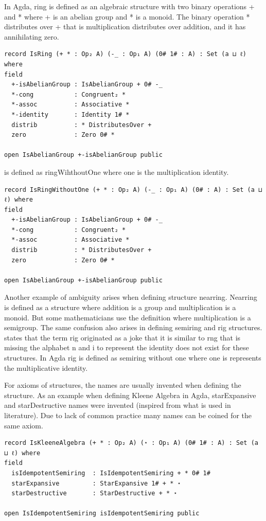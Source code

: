 In Agda, ring is defined as an algebraic structure with two binary operations +
and * where + is an abelian group and * is a monoid. The binary operation *
distributes over + that is multiplication distributes over addition, and it has
annihilating zero.

\begin{verbatim}
record IsRing (+ * : Op₂ A) (-_ : Op₁ A) (0# 1# : A) : Set (a ⊔ ℓ) where
field
  +-isAbelianGroup : IsAbelianGroup + 0# -_
  *-cong           : Congruent₂ *
  *-assoc          : Associative *
  *-identity       : Identity 1# *
  distrib          : * DistributesOver +
  zero             : Zero 0# *

open IsAbelianGroup +-isAbelianGroup public
\end{verbatim} 
 is defined as ringWihthoutOne where one is the multiplication identity.
\begin{verbatim}
record IsRingWithoutOne (+ * : Op₂ A) (-_ : Op₁ A) (0# : A) : Set (a ⊔ ℓ) where
field
  +-isAbelianGroup : IsAbelianGroup + 0# -_
  *-cong           : Congruent₂ *
  *-assoc          : Associative *
  distrib          : * DistributesOver +
  zero             : Zero 0# *

open IsAbelianGroup +-isAbelianGroup public
\end{verbatim}

Another example of ambiguity arises when defining structure nearring. Nearring
is defined as a structure where addition is a group and multiplication is a
monoid. But some mathematicians use the definition where multiplication is a
semigroup. The same confusion also arises in defining semiring and rig
structures. \cite{enwiki:1133737666} states that the term rig originated as a
joke that it is similar to rng that is missing the alphabet n and i to represent the
identity does not exist for these structures. In Agda rig is defined as semiring
without one where one is represents the multiplicative identity.

For axioms of structures, the names are usually invented when defining the
structure. As an example when defining Kleene Algebra in Agda, starExpansive and
starDestructive names were invented (inspired from what is used in literature).
Due to lack of common practice many names can be coined for the same axiom.

\begin{verbatim}
record IsKleeneAlgebra (+ * : Op₂ A) (⋆ : Op₁ A) (0# 1# : A) : Set (a ⊔ ℓ) where
field
  isIdempotentSemiring  : IsIdempotentSemiring + * 0# 1#
  starExpansive         : StarExpansive 1# + * ⋆
  starDestructive       : StarDestructive + * ⋆

open IsIdempotentSemiring isIdempotentSemiring public
\end{verbatim} 

